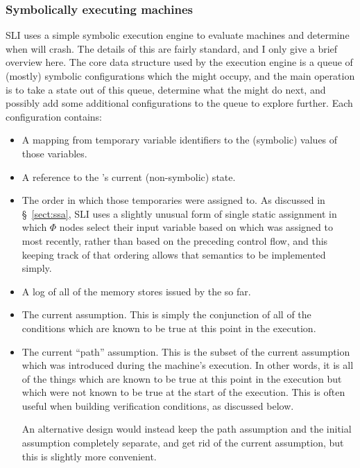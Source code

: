 \subsubsection{Symbolically executing machines}

SLI uses a simple symbolic execution engine to evaluate machines and determine when \StateMachines will crash.
The details of this are fairly standard, and I only give a brief overview here.
The core data structure used by the execution engine is a queue of (mostly) symbolic configurations which the \StateMachine might occupy, and the main operation is to take a state out of this queue, determine what the \StateMachine might do next, and possibly add some additional configurations to the queue to explore further.
Each configuration contains:

\begin{itemize}
\item
  A mapping from temporary variable identifiers to the (symbolic) values of those variables.
\item
  A reference to the {\StateMachine}'s current (non-symbolic) state.
\item
  The order in which those temporaries were assigned to.
  As discussed in \S~\ref{sect:ssa}, SLI uses a slightly unusual form of single static assignment in which $\Phi$ nodes select their input variable based on which was assigned to most recently, rather than based on the preceding control flow, and this keeping track of that ordering allows that semantics to be implemented simply.
\item
  A log of all of the memory stores issued by the \StateMachine so far.
\item
  The current assumption.
  This is simply the conjunction of all of the conditions which are known to be true at this point in the execution.
\item
  The current ``path'' assumption.
  This is the subset of the current assumption which was introduced during the machine's execution.
  In other words, it is all of the things which are known to be true at this point in the execution but which were not known to be true at the start of the execution.
  This is often useful when building verification conditions, as discussed below.

  An alternative design would instead keep the path assumption and the initial assumption completely separate, and get rid of the current assumption, but this is slightly more convenient.
\end{itemize}

